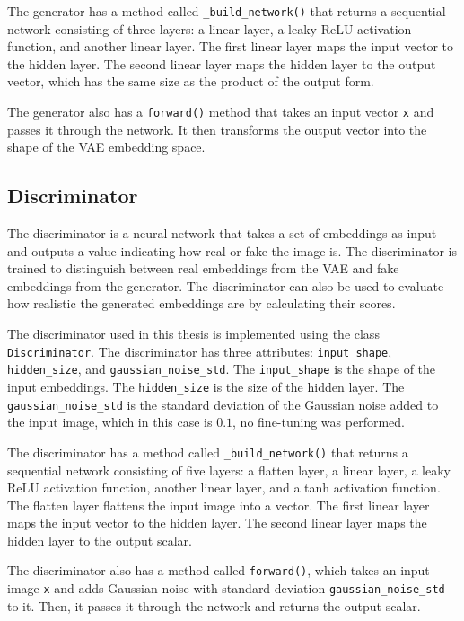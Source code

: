 The generator has a method called \texttt{\_build\_network()} that returns a sequential network consisting of three layers: a linear layer, a leaky \ac{ReLU} activation function, and another linear layer. The first linear layer maps the input vector to the hidden layer. The second linear layer maps the hidden layer to the output vector, which has the same size as the product of the output form.

The generator also has a \texttt{forward()} method that takes an input vector \texttt{x} and passes it through the network. It then transforms the output vector into the shape of the \ac{VAE} embedding space.

\subsection{Discriminator}

The discriminator is a neural network that takes a set of embeddings as input and outputs a value indicating how real or fake the image is. The discriminator is trained to distinguish between real embeddings from the \ac{VAE} and fake embeddings from the generator. The discriminator can also be used to evaluate how realistic the generated embeddings are by calculating their scores.

The discriminator used in this thesis is implemented using the class \texttt{Discriminator}. The discriminator has three attributes: \texttt{input\_shape}, \texttt{hidden\_size}, and \texttt{gaussian\_noise\_std}. The \texttt{input\_shape} is the shape of the input embeddings. The \texttt{hidden\_size} is the size of the hidden layer. The \texttt{gaussian\_noise\_std} is the standard deviation of the Gaussian noise added to the input image, which in this case is $0.1$, no fine-tuning was performed.

The discriminator has a method called \texttt{\_build\_network()} that returns a sequential network consisting of five layers: a flatten layer, a linear layer, a leaky \ac{ReLU} activation function, another linear layer, and a tanh activation function. The flatten layer flattens the input image into a vector. The first linear layer maps the input vector to the hidden layer. The second linear layer maps the hidden layer to the output scalar.

The discriminator also has a method called \texttt{forward()}, which takes an input image \texttt{x} and adds Gaussian noise with standard deviation \texttt{gaussian\_noise\_std} to it. Then, it passes it through the network and returns the output scalar.

